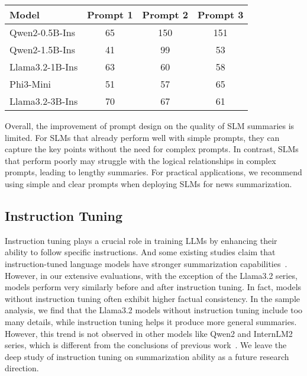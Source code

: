 \begin{table}[]
\centering
\begin{adjustbox}{max width=1\columnwidth}
\begin{tabular}{lccc}
\hline
Model & \multicolumn{1}{r}{Prompt 1} & \multicolumn{1}{r}{Prompt 2} & \multicolumn{1}{r}{Prompt 3} \\ \hline
Qwen2-0.5B-Ins  & 65 & 150 & 151 \\
Qwen2-1.5B-Ins  & 41 & 99  & 53 \\
Llama3.2-1B-Ins & 63 & 60  & 58 \\
Phi3-Mini       & 51 & 57  & 65  \\
Llama3.2-3B-Ins & 70 & 67  & 61 \\ \hline
\end{tabular}
\end{adjustbox}
\caption{ }
\label{tab:diff_prompt_length}
\end{table}



Overall, the improvement of prompt design on the quality of SLM summaries is limited. For SLMs that already perform well with simple prompts, they can capture the key points without the need for complex prompts. In contrast, SLMs that perform poorly may struggle with the logical relationships in complex prompts, leading to lengthy summaries. For practical applications, we recommend using simple and clear prompts when deploying SLMs for news summarization.
















\subsection{Instruction Tuning}
Instruction tuning plays a crucial role in training LLMs by enhancing their ability to follow specific instructions. And some existing studies claim that instruction-tuned language models have stronger summarization capabilities~\cite{goyal2022news,zhang2024benchmarking}. However, in our extensive evaluations, with the exception of the Llama3.2 series, models perform very similarly before and after instruction tuning. In fact, models without instruction tuning often exhibit higher factual consistency. In the sample analysis, we find that the Llama3.2 models without instruction tuning include too many details, while instruction tuning helps it produce more general summaries. However, this trend is not observed in other models like Qwen2 and InternLM2 series, which is different from the conclusions of previous work~\cite{zhang2024benchmarking}. We leave the deep study of instruction tuning on summarization ability as a future research direction.


